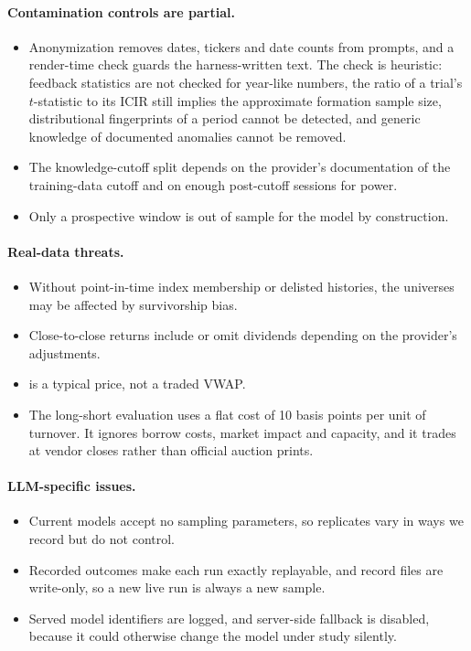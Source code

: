 \paragraph{Contamination controls are partial.}
\begin{itemize}
  \item Anonymization removes dates, tickers and date counts from prompts,
    and a render-time check guards the harness-written text. The check is
    heuristic: feedback statistics are not checked for year-like numbers,
    the ratio of a trial's $t$-statistic to its ICIR still implies the
    approximate formation sample size, distributional fingerprints of a
    period cannot be detected, and generic knowledge of documented
    anomalies cannot be removed.
  \item The knowledge-cutoff split depends on the provider's documentation
    of the training-data cutoff and on enough post-cutoff sessions for
    power.
  \item Only a prospective window is out of sample for the model by
    construction.
\end{itemize}

\paragraph{Real-data threats.}
\begin{itemize}
  \item Without point-in-time index membership or delisted histories, the
    universes may be affected by survivorship bias.
  \item Close-to-close returns include or omit dividends depending on the
    provider's adjustments.
  \item {} is a typical price, not a traded VWAP.
  \item The long-short evaluation uses a flat cost of 10 basis points per
    unit of turnover. It ignores borrow costs, market impact and capacity,
    and it trades at vendor closes rather than official auction prints.
\end{itemize}

\paragraph{LLM-specific issues.}
\begin{itemize}
  \item Current models accept no sampling parameters, so replicates vary in
    ways we record but do not control.
  \item Recorded outcomes make each run exactly replayable, and record files
    are write-only, so a new live run is always a new sample.
  \item Served model identifiers are logged, and server-side fallback is
    disabled, because it could otherwise change the model under study
    silently.
\end{itemize}
